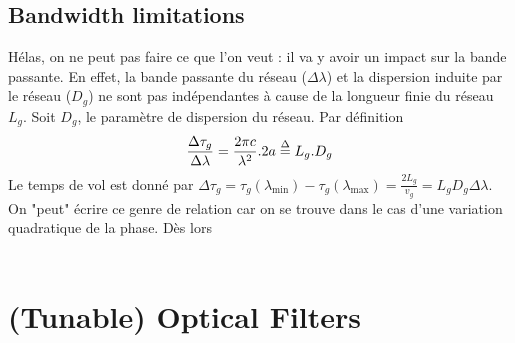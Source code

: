 \subsection{Bandwidth limitations}
Hélas, on ne peut pas faire ce que l'on veut : il va y avoir un impact sur la bande passante. En
effet, la bande passante du réseau ($\Delta\lambda$) et la dispersion induite par le réseau ($D_g$)
ne sont pas indépendantes à cause de la longueur finie du réseau $L_g$. Soit $D_g$, le paramètre 
de dispersion du réseau. Par définition
\begin{equation}
\frac{{\Delta {\tau _g}}}{{\Delta \lambda }} = \frac{{2\pi c}}{{{\lambda ^2}}}.2a \buildrel \Delta
\over = {L_g}.{D_g}
\end{equation}
Le temps de vol est donné par $\Delta {\tau _g} = {\tau _g}({\lambda _{\min }}) - {\tau _g}({\lambda
_{\max }}) = \frac{{2{L_g}}}{{{v_g}}} = {L_g}{D_g}\Delta \lambda$. On "peut" écrire ce genre de
relation car on se trouve dans le cas d'une variation quadratique de la phase. Dès lors\\

\ \\



\section{(Tunable) Optical Filters}

